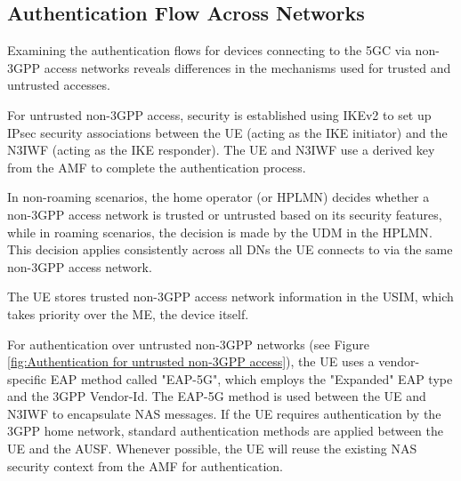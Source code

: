 \subsection{Authentication Flow Across Networks}
Examining the authentication flows for devices connecting to the \ac{5GC} via non-\ac{3GPP} access networks reveals differences in the mechanisms used for trusted and untrusted accesses.

For untrusted non-\ac{3GPP} access, security is established using \ac{IKEv2} to set up \ac{IPsec} security associations between the \ac{UE} (acting as the \ac{IKE} initiator) and the \ac{N3IWF} (acting as the \ac{IKE} responder). The \ac{UE} and \ac{N3IWF} use a derived key from the \ac{AMF} to complete the authentication process.

In non-roaming scenarios, the home operator (or \ac{HPLMN}) decides whether a non-\ac{3GPP} access network is trusted or untrusted based on its security features, while in roaming scenarios, the decision is made by the \ac{UDM} in the \ac{HPLMN}. This decision applies consistently across all \acp{DN} the \ac{UE} connects to via the same non-\ac{3GPP} access network.

The \ac{UE} stores trusted non-\ac{3GPP} access network information in the \ac{USIM}, which takes priority over the \ac{ME}, the device itself.

For authentication over untrusted non-\ac{3GPP} networks (see Figure \ref{fig:Authentication for untrusted non-3GPP access}), the \ac{UE} uses a vendor-specific \ac{EAP} method called "EAP-5G", which employs the "Expanded" \ac{EAP} type and the \ac{3GPP} Vendor-Id. The \ac{EAP-5G} method is used between the \ac{UE} and \ac{N3IWF} to encapsulate \ac{NAS} messages. If the \ac{UE} requires authentication by the \ac{3GPP} home network, standard authentication methods are applied between the \ac{UE} and the \ac{AUSF}. Whenever possible, the \ac{UE} will reuse the existing \ac{NAS} security context from the \ac{AMF} for authentication.

